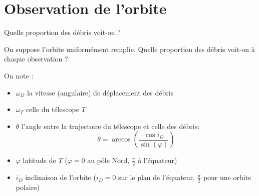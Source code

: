 \section{Observation de l'orbite}



\begin{frame}{Quelle proportion des débris voit-on ?}

On suppose l'orbite uniformément remplie. Quelle proportion des débris voit-on à chaque observation ?

\bigskip

On note :
\begin{itemize}
\item $\omega_D$ la vitesse (angulaire) de déplacement des débris
\item $\omega_T$ celle du télescope $T$
\item $\theta$ l'angle entre la trajectoire du télescope et celle des débris:
\[ \theta = \arccos\left(\frac{\cos{i_D}}{\sin(\varphi)}\right) \]
\item $\varphi$ latitude de $T$ ($\varphi = 0$ au pôle Nord, $\frac{\pi}{2}$ à l'équateur)
\item $i_D$ inclinaison de l'orbite ($i_D = 0$ sur le plan de l'équateur, $\frac{\pi}{2}$ pour une orbite polaire)
\end{itemize}

\bigskip

\end{frame}

